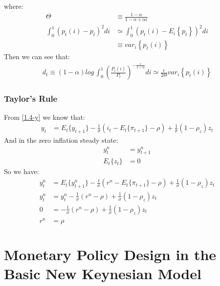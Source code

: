 \documentclass{article}
\numberwithin{equation}{section}
\begin{document}
where:
	\begin{align*}
		\Theta &\equiv \frac{1 - \alpha}{1 - \alpha + \alpha\epsilon}\\
		\int^1_0 (p_t(i) - p_t)^2 di &\simeq \int^1_0 (p_t(i) - E_i \left\{ p_t \right\})^2 di\\
		&\equiv var_i \left\{ p_t(i) \right\}
	\end{align*}
Then we can see that:
	\begin{align*}
		d_t \equiv (1 - \alpha)log\,\int^1_0 \left( \frac{P_t(i)}{P_t} \right)^{-\frac{\epsilon}{1-\alpha}} di \simeq \frac{\epsilon}{2\Theta} var_i \left\{ p_t(i) \right\}
	\end{align*}

\subsubsection{Taylor's Rule}
From \eqref{1.4-y} we know that:
	\begin{align*}
		y_t &= E_t\{y_{t+1}\} - \frac{1}{\sigma}(i_t - E_t\{\pi_{t+1}\} - \rho) + \frac{1}{\sigma}(1 - \rho_z)z_t
	\end{align*}
And in the zero inflation steady state:
	\begin{align*}
		y^n_t &= y^n_{t+1}\\
		E_t\{ z_t \} &= 0
	\end{align*}
So we have:
	\begin{align}
		y^n_t &= E_t\{y^n_{t+1}\} - \frac{1}{\sigma}(r^n - E_t\{\pi_{t+1}\} - \rho) + \frac{1}{\sigma}(1 - \rho_z)z_t \nonumber\\
		y^n_t &= y^n_{t} - \frac{1}{\sigma}(r^n - \rho) + \frac{1}{\sigma}(1 - \rho_z)z_t \nonumber\\
		0 &= - \frac{1}{\sigma}(r^n - \rho) + \frac{1}{\sigma}(1 - \rho_z)z_t \nonumber\\
		r^n &= \rho \label{app 1.4.1}
	\end{align}



\newpage
\section{Monetary Policy Design in the Basic New Keynesian Model}
\end{document}
